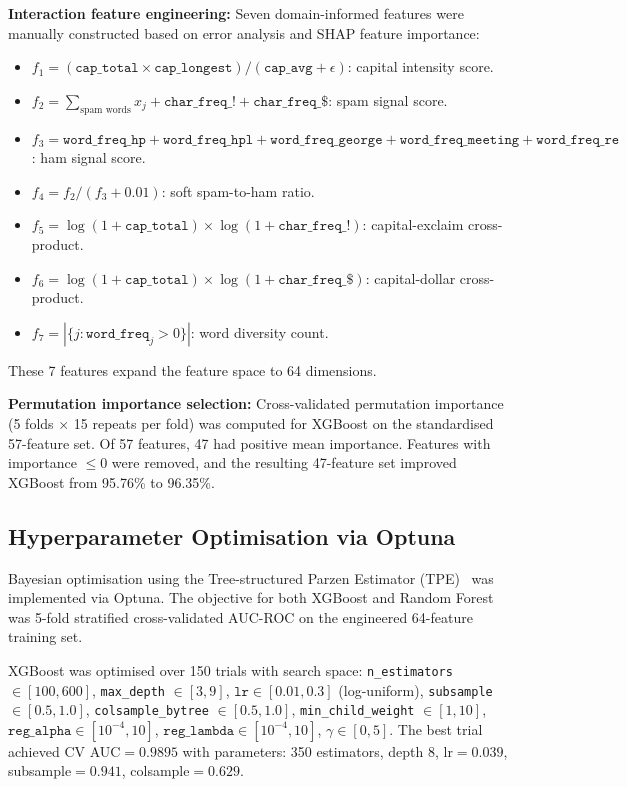 \documentclass[conference]{IEEEtran}
\begin{document}
\textbf{Interaction feature engineering:} Seven domain-informed features were manually constructed based on error analysis and SHAP feature importance:
\begin{itemize}
    \item $f_1 = (\texttt{cap\_total} \times \texttt{cap\_longest}) / (\texttt{cap\_avg} + \epsilon)$: capital intensity score.
    \item $f_2 = \sum_{\text{spam words}} x_j + \texttt{char\_freq\_!} + \texttt{char\_freq\_\$}$: spam signal score.
    \item $f_3 = \texttt{word\_freq\_hp} + \texttt{word\_freq\_hpl} + \texttt{word\_freq\_george} + \texttt{word\_freq\_meeting} + \texttt{word\_freq\_re}$: ham signal score.
    \item $f_4 = f_2 / (f_3 + 0.01)$: soft spam-to-ham ratio.
    \item $f_5 = \log(1 + \texttt{cap\_total}) \times \log(1 + \texttt{char\_freq\_!})$: capital-exclaim cross-product.
    \item $f_6 = \log(1 + \texttt{cap\_total}) \times \log(1 + \texttt{char\_freq\_\$})$: capital-dollar cross-product.
    \item $f_7 = |\{j : \texttt{word\_freq}_j > 0\}|$: word diversity count.
\end{itemize}
These 7 features expand the feature space to 64 dimensions.

\textbf{Permutation importance selection:} Cross-validated permutation importance (5 folds $\times$ 15 repeats per fold) was computed for XGBoost on the standardised 57-feature set. Of 57 features, 47 had positive mean importance. Features with importance $\leq 0$ were removed, and the resulting 47-feature set improved XGBoost from 95.76\% to 96.35\%.

\subsection{Hyperparameter Optimisation via Optuna}

Bayesian optimisation using the Tree-structured Parzen Estimator (TPE)~\cite{ref11} was implemented via Optuna. The objective for both XGBoost and Random Forest was 5-fold stratified cross-validated AUC-ROC on the engineered 64-feature training set.

XGBoost was optimised over 150 trials with search space: \texttt{n\_estimators} $\in [100,600]$, \texttt{max\_depth} $\in [3,9]$, $\texttt{lr} \in [0.01, 0.3]$ (log-uniform), \texttt{subsample} $\in [0.5,1.0]$, \texttt{colsample\_bytree} $\in [0.5,1.0]$, \texttt{min\_child\_weight} $\in [1,10]$, $\texttt{reg\_alpha} \in [10^{-4},10]$, $\texttt{reg\_lambda} \in [10^{-4},10]$, $\gamma \in [0,5]$. The best trial achieved CV AUC$=0.9895$ with parameters: 350 estimators, depth 8, lr$=0.039$, subsample$=0.941$, colsample$=0.629$.
\end{document}
